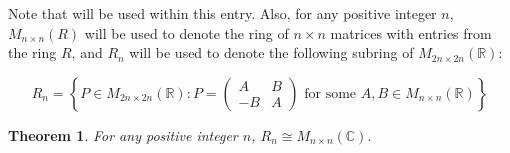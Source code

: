 \documentclass[12pt]{article}
\newtheorem*{thm*}{Theorem}
\begin{document}
Note that  will be used within this entry.  Also, for any positive integer $n$, $M_{n \times n}(R)$ will be used to denote the ring of $n \times n$ matrices with entries from the ring $R$, and $R_n$ will be used to denote the following subring of $M_{2n \times 2n}(\mathbb{R})$:

$$R_n=\left\{ P \in M_{2n \times 2n}(\mathbb{R}) : P=\left( \begin{array}{cc}
A & B \\
-B & A \end{array}
\right)  \text{ for some } A,B \in M_{n \times n}(\mathbb{R}) \right\}$$

\begin{thm*}
For any positive integer $n$, $R_n \cong M_{n \times n}(\mathbb{C})$.
\end{thm*}
\end{document}
